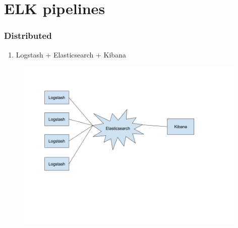 \documentclass[13pt, ignorenonframetext]{beamer}
\begin{document}
\section{ELK pipelines}
\begin{frame}
\frametitle{Distributed}
\begin{enumerate}
\item Logstash + Elasticsearch + Kibana
\end{enumerate}
\begin{figure}
\centering
\includegraphics[width=11.0cm]{images/distributed-elk.png}
\end{figure}
\end{frame}
\end{document}
